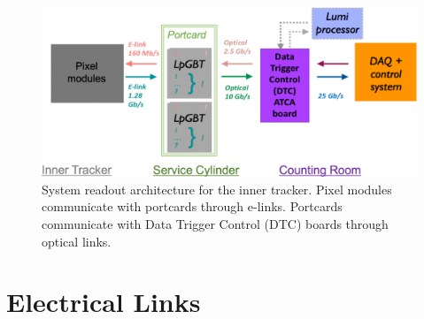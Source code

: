 \documentclass[a4paper,11pt]{article}
\begin{document}
\begin{figure}[htbp]
\centering
\includegraphics[width=1.0\textwidth,origin=c]{../figures/IT_System_Readout.jpg}
\caption{
\label{fig:readout}
System readout architecture for the inner tracker. Pixel modules communicate with portcards through e-links. Portcards communicate with Data Trigger Control (DTC) boards through optical links.
}
\end{figure}

\section{Electrical Links}
\label{sec:electrical}



%
%
%
%
%


\end{document}
